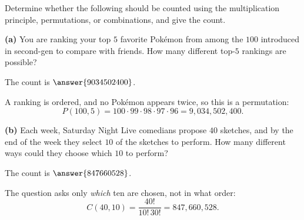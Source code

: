 \documentclass[12pt]{ximera}
\begin{document}
\begin{problem}
Determine whether the following should be counted using the multiplication principle,
permutations, or combinations, and give the count.

\begin{prompt}
\textbf{(a)} You are ranking your top $5$ favorite Pok\'emon from among the $100$
introduced in second-gen to compare with friends. How many different top-$5$ rankings
are possible?

\begin{multipleChoice}
\end{multipleChoice}

The count is $\answer{9034502400}$.

\begin{feedback}
A ranking is ordered, and no Pok\'emon appears twice, so this is a permutation:
\[
P(100,5)=100\cdot 99\cdot 98\cdot 97\cdot 96 = 9{,}034{,}502{,}400.
\]
\end{feedback}
\end{prompt}

\begin{prompt}
\textbf{(b)} Each week, Saturday Night Live comedians propose $40$ sketches, and by
the end of the week they select $10$ of the sketches to perform. How many different
ways could they choose which $10$ to perform?

\begin{multipleChoice}
\end{multipleChoice}

The count is $\answer{847660528}$.

\begin{feedback}
The question asks only \emph{which} ten are chosen, not in what order:
\[
C(40,10)=\frac{40!}{10!\,30!}=847{,}660{,}528.
\]
\end{feedback}
\end{prompt}
\end{problem}
\end{document}
